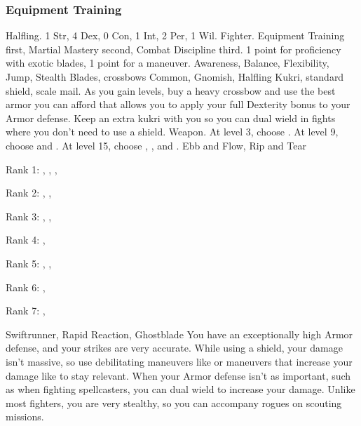         \subsubsection{Equipment Training}
             Halfling.
             1 Str, 4 Dex, 0 Con, 1 Int, 2 Per, 1 Wil.
             Fighter.
             Equipment Training first, Martial Mastery second, Combat Discipline third.
             1 point for proficiency with exotic blades, 1 point for a maneuver.
             Awareness, Balance, Flexibility, Jump, Stealth
             Blades, crossbows
             Common, Gnomish, Halfling
             Kukri, standard shield, scale mail. As you gain levels, buy a heavy crossbow and use the best armor you can afford that allows you to apply your full Dexterity bonus to your Armor defense.
                Keep an extra kukri with you so you can dual wield in fights where you don't need to use a shield.
             Weapon.
                At level 3, choose .
                At level 9, choose  and .
                At level 15, choose , , and .
             Ebb and Flow, Rip and Tear
            \begin{raggeditemize}
                \item Rank 1: , , , 
                \item Rank 2: , , 
                \item Rank 3: , , 
                \item Rank 4: , 
                \item Rank 5: , , 
                \item Rank 6: , 
                \item Rank 7: , 
            \end{raggeditemize}
             Swiftrunner, Rapid Reaction, Ghostblade
             You have an exceptionally high Armor defense, and your strikes are very accurate.
            While using a shield, your damage isn't massive, so use debilitating maneuvers like  or maneuvers that increase your damage like  to stay relevant.
            When your Armor defense isn't as important, such as when fighting spellcasters, you can dual wield to increase your damage.
            Unlike most fighters, you are very stealthy, so you can accompany rogues on scouting missions.

